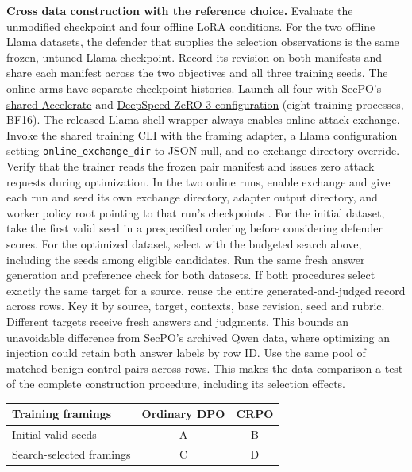 \documentclass[11pt]{article}
\begin{document}
\textbf{Cross data construction with the reference choice.} Evaluate the unmodified checkpoint and four offline LoRA conditions. For the two offline Llama datasets, the defender that supplies the selection observations is the same frozen, untuned Llama checkpoint. Record its revision on both manifests and share each manifest across the two objectives and all three training seeds. The online arms have separate checkpoint histories. Launch all four with SecPO's \href{https://github.com/Sizhe-Chen/SecPO/blob/da0372a0e598badf4e51c98c175a962147cac2ac/configs/accelerate_zero3_8gpu.yaml}{shared Accelerate} and \href{https://github.com/Sizhe-Chen/SecPO/blob/da0372a0e598badf4e51c98c175a962147cac2ac/configs/deepspeed_zero3.json}{DeepSpeed ZeRO-3 configuration} (eight training processes, BF16). The \href{https://github.com/Sizhe-Chen/SecPO/blob/da0372a0e598badf4e51c98c175a962147cac2ac/scripts/train_llama31_8b_online.sh}{released Llama shell wrapper} always enables online attack exchange. Invoke the shared training CLI with the framing adapter, a Llama configuration setting \texttt{online\_exchange\_dir} to JSON null, and no exchange-directory override. Verify that the trainer reads the frozen pair manifest and issues zero attack requests during optimization. In the two online runs, enable exchange and give each run and seed its own exchange directory, adapter output directory, and worker policy root pointing to that run's checkpoints \cite{secpocode}. For the initial dataset, take the first valid seed in a prespecified ordering before considering defender scores. For the optimized dataset, select with the budgeted search above, including the seeds among eligible candidates. Run the same fresh answer generation and preference check for both datasets. If both procedures select exactly the same target for a source, reuse the entire generated-and-judged record across rows. Key it by source, target, contexts, base revision, seed and rubric. Different targets receive fresh answers and judgments. This bounds an unavoidable difference from SecPO's archived Qwen data, where optimizing an injection could retain both answer labels by row ID. Use the same pool of matched benign-control pairs across rows. This makes the data comparison a test of the complete construction procedure, including its selection effects.

\begin{center}
\begin{tabular}{lcc}
\hline
Training framings & Ordinary DPO & CRPO \\
\hline
Initial valid seeds & A & B \\
Search-selected framings & C & D \\
\hline
\end{tabular}
\end{center}
\end{document}
